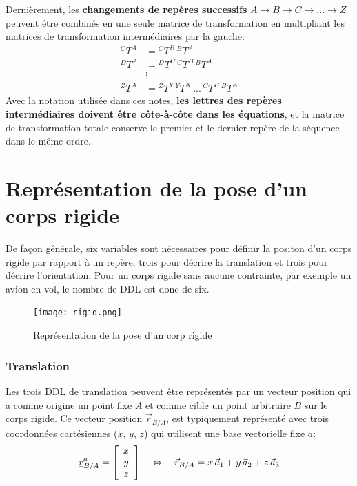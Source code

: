 Dernièrement, les \textbf{changements de repères successifs} $A \rightarrow B \rightarrow C \rightarrow ... \rightarrow Z$  peuvent être combinés en une seule matrice de transformation en multipliant les matrices de transformation intermédiaires par la gauche:
\begin{align}
{}^CT^A &=  {}^CT^B \, {}^BT^A \\
{}^DT^A &=  {}^DT^C \, {}^CT^B \, {}^BT^A \\
& \vdots \nonumber \\
{}^ZT^A &= {}^ZT^Y \, {}^YT^X \, ... \, {}^CT^B \,  {}^BT^A 
\end{align} 
Avec la notation utilisée dans ces notes, \textbf{les lettres des repères intermédiaires doivent être côte-à-côte dans les équations}, et la matrice de transformation totale conserve le premier et le dernier repère de la séquence dans le même ordre. 




\newpage
\section{Représentation de la pose d'un corps rigide}
\label{sec:corps}

De façon générale, six variables sont nécessaires pour définir la positon d'un corps rigide par rapport à un repère, trois pour décrire la translation et trois pour décrire l'orientation. Pour un corps rigide sans aucune contrainte, par exemple un avion en vol, le nombre de DDL est donc de six. 

\begin{figure}[H]
	\centering
		\texttt{[image: rigid.png]}
	\caption{Représentation de la pose d'un corp rigide}
	\label{fig:rigid}
\end{figure}

\subsubsection{Translation}
%
Les trois DDL de translation peuvent être représentés par un vecteur position qui a comme origine un point fixe $A$ et comme cible un point arbitraire $B$ sur le corps rigide. Ce vecteur position $\vec{r}_{B/A}$, est typiquement représenté avec trois coordonnées cartésiennes ($x$, $y$, $z$) qui utilisent une base vectorielle fixe $a$:
\begin{equation}
\underline{r}_{B/A}^a = \left[ \begin{array}{c} x \\  y \\ z  \end{array} \right]
\quad \Leftrightarrow  \quad 
\vec{r}_{B/A} = x \, \vec{a}_1 + y \, \vec{a}_2 + z \, \vec{a}_3
\end{equation} 

